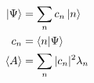 

\vspace*{\fill}
\centering

\begin{align*}
    \ket{\Psi} &= \sum_{n} c_{n} \ket{n} \\
    c_{n} &= \bra{n}\ket{\Psi} \\
    \expval{A} &= \sum_{n} |c_{n}|^2 \lambda_{n}
\end{align*}

\centering
\vspace*{\fill}

